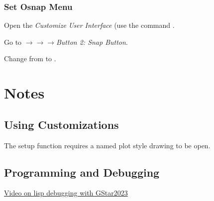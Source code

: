 \documentclass{lebook}
\begin{document}
\subsection{Set Osnap Menu}
\begin{numberedlist}
	\item Open the \textit{Customize User Interface} (use the command .
	\item Go to $\rightarrow$$\rightarrow$$\rightarrow$\textit{Button 2: Snap Button}.
	\item Change  from  to .
\end{numberedlist}

\chapter{Notes}
\section{Using Customizations}
The setup function requires a named plot style drawing to be open.

\section{Programming and Debugging}
\begin{bulletedlist}
	\item \href{https://www.youtube.com/watch?v=Rrgx3TcXNzM}{Video on lisp debugging with GStar2023}
\end{bulletedlist}
\end{document}
